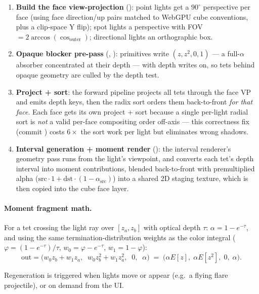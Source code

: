 \begin{enumerate}
\item \textbf{Build the face view-projection} ():
  point lights get a $90^\circ$ perspective per face (using face
  direction/up pairs matched to WebGPU cube conventions, plus a clip-space
  Y flip); spot lights a perspective with FOV $= 2\arccos(\cos_{\text{outer}})$;
  directional lights an orthographic box.
\item \textbf{Opaque blocker pre-pass} (,
  ): primitives write $(z, z^2, 0, 1)$ ---
  a full-$\alpha$ absorber concentrated at their depth --- with depth
  writes on, so tets behind opaque geometry are culled by the depth test.
\item \textbf{Project + sort}: the forward 
  pipeline projects all tets through the face VP and emits depth keys, then
  the radix sort orders them back-to-front \emph{for that face}.
  Each face gets its own project + sort because a single per-light radial
  sort is \emph{not} a valid per-face compositing order off-axis --- this
  correctness fix (commit ) costs $6\times$ the sort work per
  light but eliminates wrong shadows.
\item \textbf{Interval generation + moment render}
  (): the interval renderer's geometry pass runs from the
  light's viewpoint, and  converts each
  tet's depth interval into moment contributions, blended back-to-front
  with premultiplied alpha
  ($\text{src}\cdot 1 + \text{dst}\cdot(1-\alpha_{\text{src}})$) into a
  shared 2D staging texture, which is then copied into the cube face layer.
\end{enumerate}

\paragraph{Moment fragment math.} For a tet crossing the light ray over
$[z_a, z_b]$ with optical depth $\tau$: $\alpha = 1 - e^{-\tau}$, and using
the same termination-distribution weights as the color integral
($\varphi = (1-e^{-\tau})/\tau$, $w_0 = \varphi - e^{-\tau}$,
$w_1 = 1 - \varphi$):
\[
  \text{out} = \big( w_0 z_b + w_1 z_a,\;\; w_0 z_b^2 + w_1 z_a^2,\;\; 0,\;\;
  \alpha \big) \;=\; \big( \alpha E[z],\; \alpha E[z^2],\; 0,\; \alpha \big).
\]

Regeneration is triggered when lights move or appear (e.g.\ a flying flare
projectile), or on demand from the UI.

